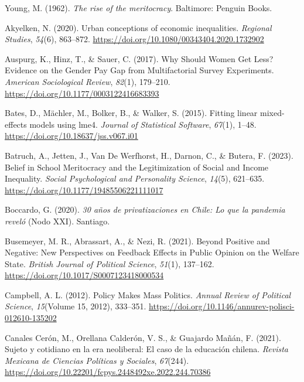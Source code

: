 \documentclass[
  12pt,
]{article}
\newlength{\cslhangindent}
\newlength{\cslentryspacingunit} %
\newenvironment{CSLReferences}[2] %
 {%
  \setlength{\parindent}{0pt}
  \ifodd #1
  \let\oldpar\par
  \def\par{\hangindent=\cslhangindent\oldpar}
  \fi
  \setlength{\parskip}{#2\cslentryspacingunit}
 }%
 {}
\begin{document}
\begin{CSLReferences}{1}{0}
\leavevmode{}%
Young, M. (1962). \emph{The rise of the meritocracy}. Baltimore: Penguin
Books.

\leavevmode{}%
Akyelken, N. (2020). Urban conceptions of economic inequalities.
\emph{Regional Studies}, \emph{54}(6), 863--872.
\url{https://doi.org/10.1080/00343404.2020.1732902}

\leavevmode{}%
Auspurg, K., Hinz, T., \& Sauer, C. (2017). Why {Should Women Get Less}?
{Evidence} on the {Gender Pay Gap} from {Multifactorial Survey
Experiments}. \emph{American Sociological Review}, \emph{82}(1),
179--210. \url{https://doi.org/10.1177/0003122416683393}

\leavevmode{}%
Bates, D., Mächler, M., Bolker, B., \& Walker, S. (2015). Fitting linear
mixed-effects models using {lme4}. \emph{Journal of Statistical
Software}, \emph{67}(1), 1--48.
\url{https://doi.org/10.18637/jss.v067.i01}

\leavevmode{}%
Batruch, A., Jetten, J., Van De Werfhorst, H., Darnon, C., \& Butera, F.
(2023). Belief in {School Meritocracy} and the {Legitimization} of
{Social} and {Income Inequality}. \emph{Social Psychological and
Personality Science}, \emph{14}(5), 621--635.
\url{https://doi.org/10.1177/19485506221111017}

\leavevmode{}%
Boccardo, G. (2020). \emph{30 a{ñ}os de privatizaciones en {Chile}: Lo
que la pandemia revel{ó}} (Nodo XXI). Santiago.

\leavevmode{}%
Busemeyer, M. R., Abrassart, A., \& Nezi, R. (2021). Beyond {Positive}
and {Negative}: {New Perspectives} on {Feedback Effects} in {Public
Opinion} on the {Welfare State}. \emph{British Journal of Political
Science}, \emph{51}(1), 137--162.
\url{https://doi.org/10.1017/S0007123418000534}

\leavevmode{}%
Campbell, A. L. (2012). Policy {Makes Mass Politics}. \emph{Annual
Review of Political Science}, \emph{15}(Volume 15, 2012), 333--351.
\url{https://doi.org/10.1146/annurev-polisci-012610-135202}

\leavevmode{}%
Canales Cerón, M., Orellana Calderón, V. S., \& Guajardo Mañán, F.
(2021). Sujeto y cotidiano en la era neoliberal: El caso de la
educaci{ó}n chilena. \emph{Revista Mexicana de Ciencias Pol{í}ticas y
Sociales}, \emph{67}(244).
\url{https://doi.org/10.22201/fcpys.2448492xe.2022.244.70386}


\end{CSLReferences}
\end{document}
